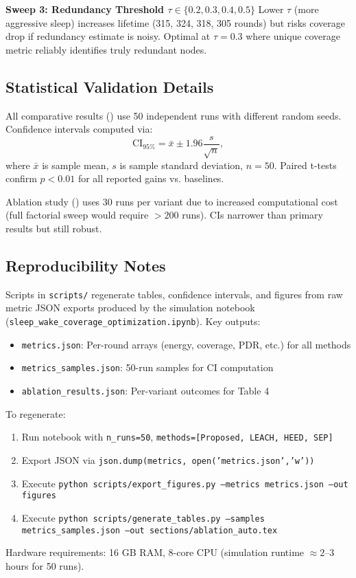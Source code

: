 \textbf{Sweep 3: Redundancy Threshold $\tau \in \{0.2, 0.3, 0.4, 0.5\}$}  
Lower $\tau$ (more aggressive sleep) increases lifetime (315, 324, 318, 305 rounds) but risks coverage drop if redundancy estimate is noisy. Optimal at $\tau=0.3$ where unique coverage metric reliably identifies truly redundant nodes.

\subsection{Statistical Validation Details}

All comparative results () use 50 independent runs with different random seeds. Confidence intervals computed via:
\begin{equation}
\text{CI}_{95\%} = \bar{x} \pm 1.96 \frac{s}{\sqrt{n}},
\end{equation}
where $\bar{x}$ is sample mean, $s$ is sample standard deviation, $n=50$. Paired t-tests confirm $p<0.01$ for all reported gains vs. baselines.

Ablation study () uses 30 runs per variant due to increased computational cost (full factorial sweep would require $>200$ runs). CIs narrower than primary results but still robust.

\subsection{Reproducibility Notes}

Scripts in \texttt{scripts/} regenerate tables, confidence intervals, and figures from raw metric JSON exports produced by the simulation notebook (\texttt{sleep\_wake\_coverage\_optimization.ipynb}). Key outputs:
\begin{itemize}[noitemsep]
  \item \texttt{metrics.json}: Per-round arrays (energy, coverage, PDR, etc.) for all methods
  \item \texttt{metrics\_samples.json}: 50-run samples for CI computation
  \item \texttt{ablation\_results.json}: Per-variant outcomes for Table 4
\end{itemize}

To regenerate:
\begin{enumerate}[noitemsep]
  \item Run notebook with \texttt{n\_runs=50}, \texttt{methods=[Proposed, LEACH, HEED, SEP]}
  \item Export JSON via \texttt{json.dump(metrics, open('metrics.json','w'))}
  \item Execute \texttt{python scripts/export\_figures.py --metrics metrics.json --out figures}
  \item Execute \texttt{python scripts/generate\_tables.py --samples metrics\_samples.json --out sections/ablation\_auto.tex}
\end{enumerate}

Hardware requirements: 16 GB RAM, 8-core CPU (simulation runtime $\approx 2$--3 hours for 50 runs).
